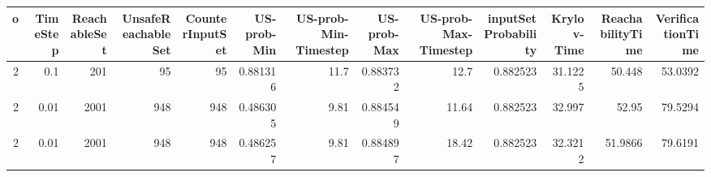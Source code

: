 \begin{tabular}{rrrrrrrrrrrrr}
\hline
   o &   TimeStep &   ReachableSet &   UnsafeReachableSet &   CounterInputSet &   US-prob-Min &   US-prob-Min-Timestep &   US-prob-Max &   US-prob-Max-Timestep &   inputSet Probability &   Krylov-Time &   ReachabilityTime &   VerificationTime \\
\hline
   2 &       0.1  &            201 &                   95 &                95 &      0.881316 &                  11.7  &      0.883732 &                  12.7  &               0.882523 &       31.1225 &            50.448  &            53.0392 \\
   2 &       0.01 &           2001 &                  948 &               948 &      0.486305 &                   9.81 &      0.884549 &                  11.64 &               0.882523 &       32.997  &            52.95   &            79.5294 \\
   2 &       0.01 &           2001 &                  948 &               948 &      0.486257 &                   9.81 &      0.884897 &                  18.42 &               0.882523 &       32.3212 &            51.9866 &            79.6191 \\
\hline
\end{tabular}



